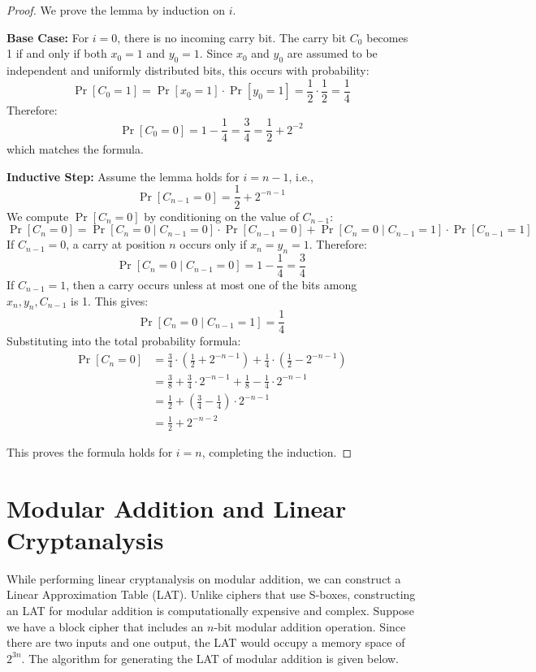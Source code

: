 \documentclass[runningheads]{llncs}
\begin{document}
\begin{proof}
We prove the lemma by induction on \( i \).

\textbf{Base Case:} For \( i = 0 \), there is no incoming carry bit. The carry bit \( C_0 \) becomes 1 if and only if both \( x_0 = 1 \) and \( y_0 = 1 \). Since \( x_0 \) and \( y_0 \) are assumed to be independent and uniformly distributed bits, this occurs with probability:
\[
\Pr[C_0 = 1] = \Pr[x_0 = 1] \cdot \Pr[y_0 = 1] = \frac{1}{2} \cdot \frac{1}{2} = \frac{1}{4}
\]
Therefore:
\[
\Pr[C_0 = 0] = 1 - \frac{1}{4} = \frac{3}{4} = \frac{1}{2} + 2^{-2}
\]
which matches the formula.

\textbf{Inductive Step:} Assume the lemma holds for \( i = n - 1 \), i.e.,
\[
\Pr[C_{n-1} = 0] = \frac{1}{2} + 2^{-n-1}
\]
We compute \( \Pr[C_n = 0] \) by conditioning on the value of \( C_{n-1} \):
\[
\Pr[C_n = 0] = \Pr[C_n = 0 \mid C_{n-1} = 0] \cdot \Pr[C_{n-1} = 0] + \Pr[C_n = 0 \mid C_{n-1} = 1] \cdot \Pr[C_{n-1} = 1]
\]
If \( C_{n-1} = 0 \), a carry at position \( n \) occurs only if \( x_n = y_n = 1 \). Therefore:
\[
\Pr[C_n = 0 \mid C_{n-1} = 0] = 1 - \frac{1}{4} = \frac{3}{4}
\]
If \( C_{n-1} = 1 \), then a carry occurs unless at most one of the bits among \( x_n, y_n, C_{n-1} \) is 1. This gives:
\[
\Pr[C_n = 0 \mid C_{n-1} = 1] = \frac{1}{4}
\]
Substituting into the total probability formula:
\begin{align*}
\Pr[C_n = 0] &= \frac{3}{4} \cdot \left( \frac{1}{2} + 2^{-n-1} \right) + \frac{1}{4} \cdot \left( \frac{1}{2} - 2^{-n-1} \right) \\
&= \frac{3}{8} + \frac{3}{4} \cdot 2^{-n-1} + \frac{1}{8} - \frac{1}{4} \cdot 2^{-n-1} \\
&= \frac{1}{2} + \left( \frac{3}{4} - \frac{1}{4} \right) \cdot 2^{-n-1} \\
&= \frac{1}{2} + 2^{-n-2}
\end{align*}

This proves the formula holds for \( i = n \), completing the induction.
\end{proof}



\section{Modular Addition and Linear Cryptanalysis}

While performing linear cryptanalysis on modular addition, we can construct a Linear Approximation Table (LAT). Unlike ciphers that use S-boxes, constructing an LAT for modular addition is computationally expensive and complex. Suppose we have a block cipher that includes an \( n \)-bit modular addition operation. Since there are two inputs and one output, the LAT would occupy a memory space of \( 2^{3n} \). The algorithm for generating the LAT of modular addition is given below.
\end{document}
